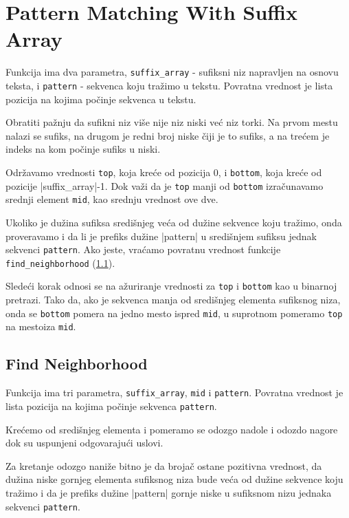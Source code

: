 \section{Pattern Matching With Suffix Array}

Funkcija ima dva parametra, \texttt{suffix\_array} - sufiksni niz napravljen na osnovu teksta, i \texttt{pattern} - sekvenca koju tražimo u tekstu. Povratna vrednost je lista pozicija na kojima počinje sekvenca u tekstu.


Obratiti pažnju da sufikni niz više nije niz niski već niz torki. Na prvom mestu nalazi se sufiks, na drugom je redni broj niske čiji je to sufiks, a na trećem je indeks na kom počinje sufiks u niski.

Održavamo vrednosti \texttt{top}, koja kreće od pozicija 0, i \texttt{bottom}, koja kreće od pozicije |suffix\_array|-1. Dok važi da je \texttt{top} manji od \texttt{bottom} izračunavamo srednji element \texttt{mid}, kao srednju vrednost ove dve. 

Ukoliko je dužina sufiksa središnjeg veća od dužine sekvence koju tražimo, onda proveravamo i da li je prefiks dužine |pattern| u središnjem sufiksu jednak sekvenci \texttt{pattern}. Ako jeste, vraćamo povratnu vrednost funkcije \texttt{find\_neighborhood} (\ref{findNeighborhoodM}). 

Sledeći korak odnosi se na ažuriranje vrednosti za \texttt{top} i \texttt{bottom} kao u binarnoj pretrazi. Tako da, ako je sekvenca manja od središnjeg elementa sufiksnog niza, onda se \texttt{bottom} pomera na jedno mesto ispred \texttt{mid}, u suprotnom pomeramo \texttt{top} na mestoiza \texttt{mid}.




\subsection{Find Neighborhood}
\label{findNeighborhoodM}


Funkcija ima tri parametra, \texttt{suffix\_array}, \texttt{mid} i \texttt{pattern}. Povratna vrednost je lista pozicija na kojima počinje sekvenca \texttt{pattern}.

Krećemo od središnjeg elementa i pomeramo se odozgo nadole i odozdo nagore dok su uspunjeni odgovarajući uslovi. 

Za kretanje odozgo naniže bitno je da brojač ostane pozitivna vrednost, da dužina niske gornjeg elementa sufiksnog niza bude veća od dužine sekvence koju tražimo i da je prefiks dužine |pattern| gornje niske u sufiksnom nizu jednaka sekvenci \texttt{pattern}. 

